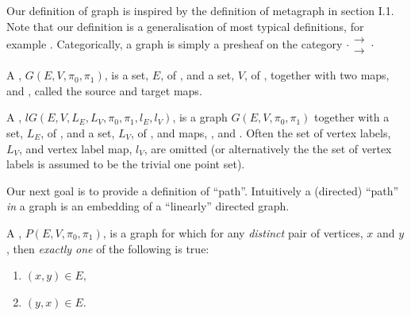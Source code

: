\documentclass[a4paper,openany]{amsart}
\begin{document}
Our definition of graph is inspired by the definition of metagraph in
\cite{macLane1971categoriesWorkingMathematician} section I.1. Note that our definition is
a generalisation of most typical definitions, for example \cite[section
1.1]{diestel2006graphTheory}. Categorically, a graph is simply a presheaf on the category
$ \cdot \substack{\mathbf{\longrightarrow} \\[-0.7ex] \mathbf{\longrightarrow}} \cdot $

\begin{definition}

A , $G(E, V, \pi_0, \pi_1)$, is a set, $E$, of
, and a set, $V$, of , together with two maps, 
 and , called the source and target maps.

A , $lG(E, V, L_E, L_V, \pi_0, \pi_1, l_E, l_V)$, is a graph $G(E, 
V, \pi_0, \pi_1)$ together with a set, $L_E$, of , and a set, $L_V$, 
of , and maps, , and . Often the 
set of vertex labels, $L_V$, and vertex label map, $l_V$, are omitted (or 
alternatively the the set of vertex labels is assumed to be the trivial one point set).

\end{definition}

Our next goal is to provide a definition of ``path''. Intuitively a (directed) ``path''
\emph{in} a graph is an embedding of a ``linearly'' directed graph.

\begin{definition}

A , $P(E, V, \pi_0, \pi_1)$, is a graph for which for any
\emph{distinct} pair of vertices, $x$ and $y$, then \emph{exactly one} of the following is
true:

\begin{enumerate}
\item $(x,y) \in E$, 
\item $(y,x) \in E$.
\end{enumerate}

\end{definition}
\end{document}
